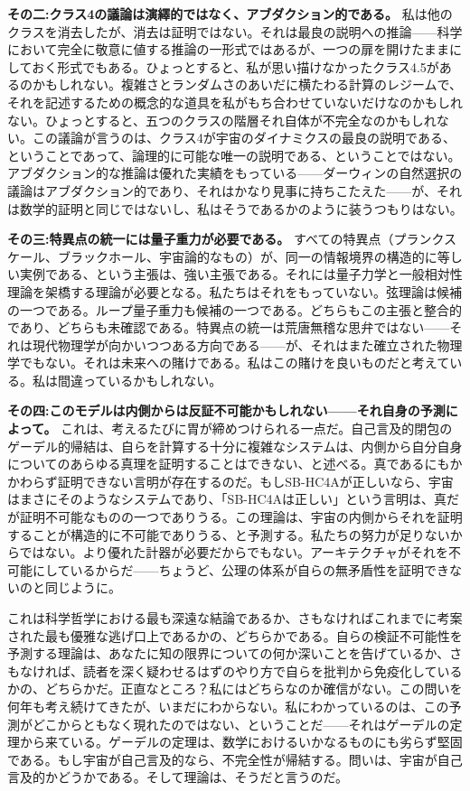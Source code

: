 \documentclass[11pt, twoside, openright]{book}
\begin{document}
\textbf{その二:クラス4の議論は演繹的ではなく、アブダクション的である。} 私は他のクラスを消去したが、消去は証明ではない。それは最良の説明への推論------科学において完全に敬意に値する推論の一形式ではあるが、一つの扉を開けたままにしておく形式でもある。ひょっとすると、私が思い描けなかったクラス4.5があるのかもしれない。複雑さとランダムさのあいだに横たわる計算のレジームで、それを記述するための概念的な道具を私がもち合わせていないだけなのかもしれない。ひょっとすると、五つのクラスの階層それ自体が不完全なのかもしれない。この議論が言うのは、クラス4が宇宙のダイナミクスの最良の説明である、ということであって、論理的に可能な唯一の説明である、ということではない。アブダクション的な推論は優れた実績をもっている------ダーウィンの自然選択の議論はアブダクション的であり、それはかなり見事に持ちこたえた------が、それは数学的証明と同じではないし、私はそうであるかのように装うつもりはない。

\textbf{その三:特異点の統一には量子重力が必要である。} すべての特異点（プランクスケール、ブラックホール、宇宙論的なもの）が、同一の情報境界の構造的に等しい実例である、という主張は、強い主張である。それには量子力学と一般相対性理論を架橋する理論が必要となる。私たちはそれをもっていない。弦理論は候補の一つである。ループ量子重力も候補の一つである。どちらもこの主張と整合的であり、どちらも未確認である。特異点の統一は荒唐無稽な思弁ではない------それは現代物理学が向かいつつある方向である------が、それはまた確立された物理学でもない。それは未来への賭けである。私はこの賭けを良いものだと考えている。私は間違っているかもしれない。

\textbf{その四:このモデルは内側からは反証不可能かもしれない------それ自身の予測によって。} これは、考えるたびに胃が締めつけられる一点だ。自己言及的閉包のゲーデル的帰結は、自らを計算する十分に複雑なシステムは、内側から自分自身についてのあらゆる真理を証明することはできない、と述べる。真であるにもかかわらず証明できない言明が存在するのだ。もしSB-HC4Aが正しいなら、宇宙はまさにそのようなシステムであり、「SB-HC4Aは正しい」という言明は、真だが証明不可能なものの一つでありうる。この理論は、宇宙の内側からそれを証明することが構造的に不可能でありうる、と予測する。私たちの努力が足りないからではない。より優れた計器が必要だからでもない。アーキテクチャがそれを不可能にしているからだ------ちょうど、公理の体系が自らの無矛盾性を証明できないのと同じように。

これは科学哲学における最も深遠な結論であるか、さもなければこれまでに考案された最も優雅な逃げ口上であるかの、どちらかである。自らの検証不可能性を予測する理論は、あなたに知の限界についての何か深いことを告げているか、さもなければ、読者を深く疑わせるはずのやり方で自らを批判から免疫化しているかの、どちらかだ。正直なところ？私にはどちらなのか確信がない。この問いを何年も考え続けてきたが、いまだにわからない。私にわかっているのは、この予測がどこからともなく現れたのではない、ということだ------それはゲーデルの定理から来ている。ゲーデルの定理は、数学におけるいかなるものにも劣らず堅固である。もし宇宙が自己言及的なら、不完全性が帰結する。問いは、宇宙が自己言及的かどうかである。そして理論は、そうだと言うのだ。
\end{document}

